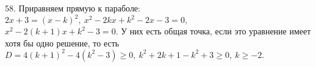 58. Приравняем прямую к параболе: $2x+3=(x-k)^2,\ x^2-2kx+k^2-2x-3=0,$\\$ x^2-2(k+1)x+k^2-3=0.$ У них есть общая точка, если это уравнение имеет хотя бы одно решение, то есть $D=4(k+1)^2-4(k^2-3)\geqslant0,\ k^2+2k+1-k^2+3\geqslant0,\ k\geqslant-2.$\\
